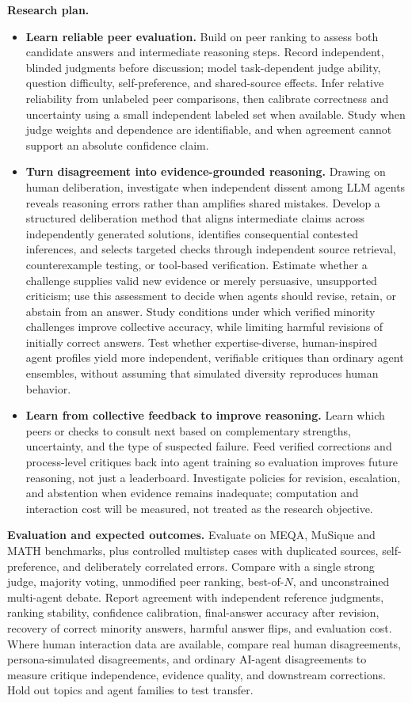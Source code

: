 \documentclass[10pt,letterpaper]{article}
\newcommand{\head}[1]{\textbf{#1}\enspace}
\begin{document}
\par\head{Research plan.}
\begin{itemize}
\item \textbf{Learn reliable peer evaluation.} Build on peer ranking to assess both candidate answers and intermediate reasoning steps. Record independent, blinded judgments before discussion; model task-dependent judge ability, question difficulty, self-preference, and shared-source effects. Infer relative reliability from unlabeled peer comparisons, then calibrate correctness and uncertainty using a small independent labeled set when available. Study when judge weights and dependence are identifiable, and when agreement cannot support an absolute confidence claim.
\item \textbf{Turn disagreement into evidence-grounded reasoning.} Drawing on human deliberation, investigate when independent dissent among LLM agents reveals reasoning errors rather than amplifies shared mistakes. Develop a structured deliberation method that aligns intermediate claims across independently generated solutions, identifies consequential contested inferences, and selects targeted checks through independent source retrieval, counterexample testing, or tool-based verification. Estimate whether a challenge supplies valid new evidence or merely persuasive, unsupported criticism; use this assessment to decide when agents should revise, retain, or abstain from an answer. Study conditions under which verified minority challenges improve collective accuracy, while limiting harmful revisions of initially correct answers. Test whether expertise-diverse, human-inspired agent profiles yield more independent, verifiable critiques than ordinary agent ensembles, without assuming that simulated diversity reproduces human behavior.
\item \textbf{Learn from collective feedback to improve reasoning.} Learn which peers or checks to consult next based on complementary strengths, uncertainty, and the type of suspected failure. Feed verified corrections and process-level critiques back into agent training so evaluation improves future reasoning, not just a leaderboard. Investigate policies for revision, escalation, and abstention when evidence remains inadequate; computation and interaction cost will be measured, not treated as the research objective.
\end{itemize}
\head{Evaluation and expected outcomes.} Evaluate on MEQA, MuSique and MATH benchmarks, plus controlled multistep cases with duplicated sources, self-preference, and deliberately correlated errors. Compare with a single strong judge, majority voting, unmodified peer ranking, best-of-$N$, and unconstrained multi-agent debate. Report agreement with independent reference judgments, ranking stability, confidence calibration, final-answer accuracy after revision, recovery of correct minority answers, harmful answer flips, and evaluation cost. Where human interaction data are available, compare real human disagreements, persona-simulated disagreements, and ordinary AI-agent disagreements to measure critique independence, evidence quality, and downstream corrections. Hold out topics and agent families to test transfer.
\end{document}

